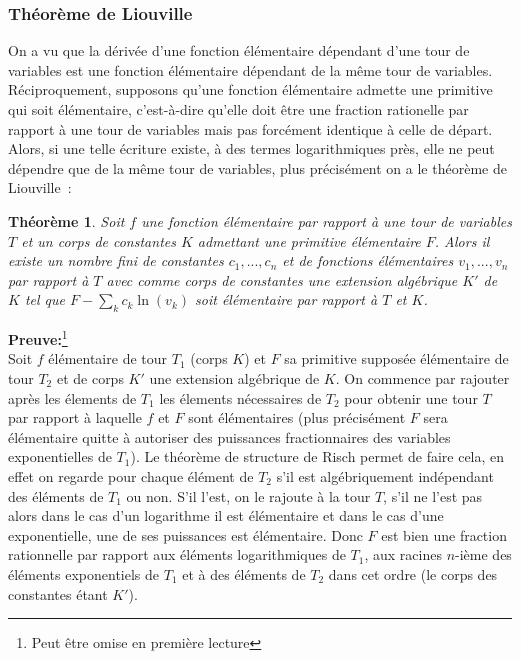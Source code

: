 \documentclass[a4paper,11pt]{article}
\newtheorem{thm}{Théorème}
\begin{document}
\subsubsection{Théorème de Liouville}
On a vu que la d\'eriv\'ee d'une fonction élémentaire dépendant 
d'une tour de variables est une fonction élémentaire dépendant 
de la même tour de variables.
Réciproquement, supposons qu'une fonction élémentaire admette
une primitive qui soit élémentaire, c'est-à-dire qu'elle doit
être une fraction rationelle par rapport à une tour de variables
mais pas forcément identique à celle de départ. Alors, si une telle
écriture existe, à des termes logarithmiques près, elle
ne peut dépendre que de la même tour de variables, plus précisément
on a le théorème de Liouville~:
\begin{thm}
Soit $f$ une fonction élémentaire par rapport à une tour de variables $T$
et un corps de constantes $K$ admettant une primitive élémentaire $F$. Alors 
il existe un nombre fini de constantes $c_1,...,c_n$ et de fonctions
élémentaires $v_1,...,v_n$ par rapport à $T$ avec comme corps de constantes
une extension algébrique $K'$ de $K$ tel que $F - \sum_k c_k \ln(v_k) $
soit élémentaire par rapport à $T$ et $K$.
\end{thm}

{\bf Preuve:}\footnote{Peut être omise en première lecture}\\
Soit $f$ élémentaire de tour $T_1$ (corps $K$) et 
$F$ sa primitive supposée élémentaire de tour $T_2$ et de corps $K'$
une extension algébrique de $K$. 
On commence par rajouter après les élements de $T_1$ les 
élements nécessaires de $T_2$ pour obtenir une tour $T$ par rapport
à laquelle $f$ et $F$ sont élémentaires (plus précisément $F$ sera
élémentaire quitte à autoriser des puissances fractionnaires
des variables exponentielles de $T_1$). Le théorème de structure
de Risch permet de faire cela, en effet on regarde pour chaque
élément de $T_2$ s'il est algébriquement indépendant des éléments
de $T_1$ ou non. S'il l'est, on le rajoute à la tour $T$, s'il
ne l'est pas alors dans le cas d'un logarithme il est élémentaire
et dans le cas d'une exponentielle, une de ses puissances est
élémentaire. Donc $F$ est bien une fraction rationnelle par rapport
aux éléments logarithmiques de $T_1$, aux racines $n$-ième
des éléments exponentiels de $T_1$ et à des éléments de $T_2$
dans cet ordre (le corps des constantes étant $K'$).
\end{document}
